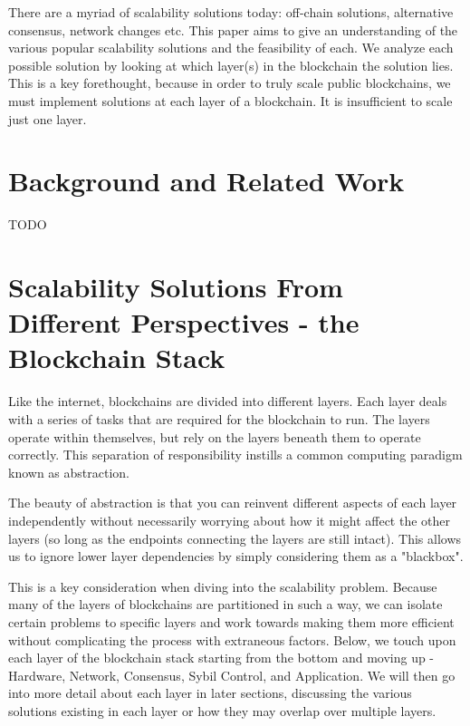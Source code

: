 \documentclass{article}
\begin{document}
There are a myriad of scalability solutions today: off-chain solutions, alternative consensus, network changes etc. This paper aims to give an understanding of the various popular scalability solutions and the feasibility of each. We analyze each possible solution by looking at which layer(s) in the blockchain the solution lies. This is a key forethought, because in order to truly scale public blockchains, we must implement solutions at each layer of a blockchain. It is insufficient to scale just one layer.



\section{Background and Related Work}
TODO

\section{Scalability Solutions From Different Perspectives - the Blockchain Stack}
Like the internet, blockchains are divided into different layers. Each layer deals with a series of tasks that are required for the blockchain to run. The layers operate within themselves, but rely on the layers beneath them to operate correctly. This separation of responsibility instills a common computing paradigm known as abstraction.

The beauty of abstraction is that you can reinvent different aspects of each layer independently without necessarily worrying about how it might affect the other layers (so long as the endpoints connecting the layers are still intact). This allows us to ignore lower layer dependencies by simply considering them as a "blackbox".

This is a key consideration when diving into the scalability problem. Because many of the layers of blockchains are partitioned in such a way, we can isolate certain problems to specific layers and work towards making them more efficient without complicating the process with extraneous factors\footnotemark. Below, we touch upon each layer of the blockchain stack starting from the bottom and moving up - Hardware, Network, Consensus, Sybil Control, and Application. We will then go into more detail about each layer in later sections, discussing the various solutions existing in each layer or how they may overlap over multiple layers.

\end{document}
